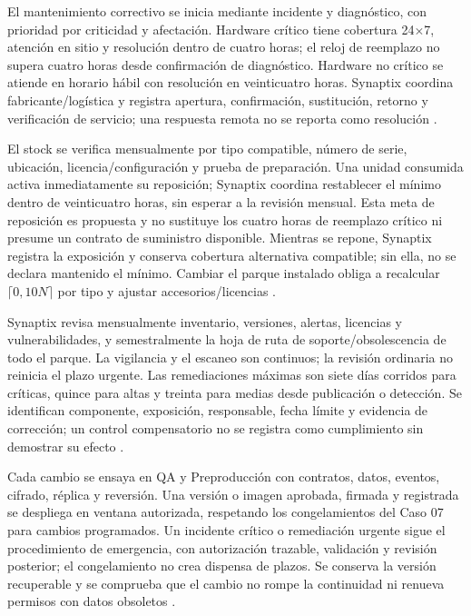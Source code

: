 El mantenimiento correctivo se inicia mediante incidente y diagnóstico, con prioridad por criticidad y afectación. Hardware crítico tiene cobertura 24$\times$7, atención en sitio y resolución dentro de cuatro horas; el reloj de reemplazo no supera cuatro horas desde confirmación de diagnóstico. Hardware no crítico se atiende en horario hábil con resolución en veinticuatro horas. Synaptix coordina fabricante/logística y registra apertura, confirmación, sustitución, retorno y verificación de servicio; una respuesta remota no se reporta como resolución \parencite[secc.~8.4, pp.~19--20]{pucv-transversal}.

El stock se verifica mensualmente por tipo compatible, número de serie, ubicación, licencia/configuración y prueba de preparación. Una unidad consumida activa inmediatamente su reposición; Synaptix coordina restablecer el mínimo dentro de veinticuatro horas, sin esperar a la revisión mensual. Esta meta de reposición es propuesta y no sustituye los cuatro horas de reemplazo crítico ni presume un contrato de suministro disponible. Mientras se repone, Synaptix registra la exposición y conserva cobertura alternativa compatible; sin ella, no se declara mantenido el mínimo. Cambiar el parque instalado obliga a recalcular $\lceil0,10N\rceil$ por tipo y ajustar accesorios/licencias \parencite[secc.~8.4, pp.~19--20]{pucv-transversal}.

Synaptix revisa mensualmente inventario, versiones, alertas, licencias y vulnerabilidades, y semestralmente la hoja de ruta de soporte/obsolescencia de todo el parque. La vigilancia y el escaneo son continuos; la revisión ordinaria no reinicia el plazo urgente. Las remediaciones máximas son siete días corridos para críticas, quince para altas y treinta para medias desde publicación o detección. Se identifican componente, exposición, responsable, fecha límite y evidencia de corrección; un control compensatorio no se registra como cumplimiento sin demostrar su efecto \parencite[RT-11.04, p.~23; secc.~1.6, p.~5]{pucv-transversal}.

Cada cambio se ensaya en QA y Preproducción con contratos, datos, eventos, cifrado, réplica y reversión. Una versión o imagen aprobada, firmada y registrada se despliega en ventana autorizada, respetando los congelamientos del Caso 07 para cambios programados. Un incidente crítico o remediación urgente sigue el procedimiento de emergencia, con autorización trazable, validación y revisión posterior; el congelamiento no crea dispensa de plazos. Se conserva la versión recuperable y se comprueba que el cambio no rompe la continuidad ni renueva permisos con datos obsoletos \parencite[cap.~17, secc.~17.4]{caso07}.

